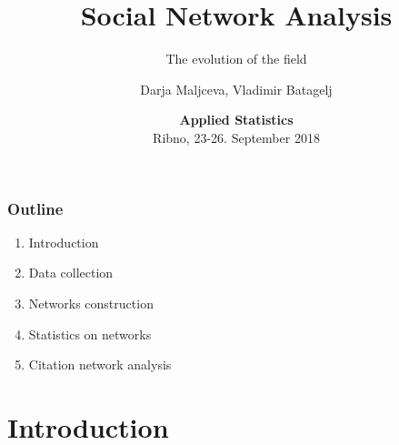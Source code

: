 \documentclass[hyperref={pdfstartview={FitBH -32768},
                         pdfpagemode=FullScreen,
                         plainpages=false,
                         colorlinks=true}
              ]{beamer}
\title[SNA. Evolution of the field]{\textbf{Social Network Analysis}}\subtitle{The evolution of the field}
\author[D. Maltseva, V. Batagelj]{Darja Maljceva, Vladimir Batagelj}
\institute[IMFM \& IAM UP]{IMFM Ljubljana, IAM UP Koper and NRU HSE Moscow }
\date[September 23-26, 2018]{\small
\textcolor{BrickRed}{\textbf{Applied Statistics}} \\
Ribno, 23-26. September 2018}
\newcommand{\clock}{\count254=\time \divide\count254 by 60
 \count255=\count254 \multiply\count255 by -60
 \advance\count255 by \time
 \ifnum\count254<10 0\fi\number\count254\,:\,%
 \ifnum\count255<10 0\fi\number\count255}
\begin{document}

\frame{\maketitle}

\begin{frame}
\frametitle{Outline}
\small
\begin{enumerate}
\item Introduction 
\item Data collection 
\item Networks construction 
\item Statistics on networks
\item Citation network analysis
\end{enumerate}




\end{frame}

\section{Introduction}
\end{document}
